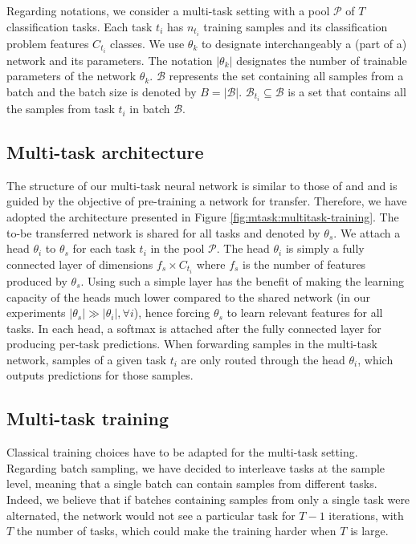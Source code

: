 Regarding notations, we consider a multi-task setting with a pool $\mathcal{P}$ of $T$ classification tasks. Each task $t_i$ has $n_{t_i}$ training samples and its classification problem features $C_{t_i}$ classes. We use $\theta_k$ to designate interchangeably a (part of a) network and its parameters. The notation $|\theta_k|$ designates the number of trainable parameters of the network $\theta_k$. $\mathcal{B}$ represents the set containing all samples from a batch and the batch size is denoted by $B = \left|\mathcal{B}\right|$. $\mathcal{B}_{t_i} \subseteq \mathcal{B}$ is a set that contains all the samples from task $t_i$ in batch $\mathcal{B}$. 

\subsection{Multi-task architecture}
\label{ssec:mtask:multitask-architecture}

The structure of our multi-task neural network is similar to those of \cite{shang2019and} and \cite{strezoski2019many} and is guided by the objective of pre-training a network for transfer. Therefore, we have adopted the architecture presented in Figure \ref{fig:mtask:multitask-training}. The to-be transferred network is shared for all tasks and denoted by $\theta_s$. We attach a head $\theta_i$ to $\theta_s$ for each task $t_i$ in the pool $\mathcal{P}$. The head $\theta_i$ is simply a fully connected layer of dimensions $f_s\times C_{t_i}$ where $f_s$ is the number of features produced by $\theta_s$. Using such a simple layer has the benefit of making the learning capacity of the heads much lower compared to the shared network (in our experiments $|\theta_s| \gg |\theta_i|, \forall i$), hence forcing $\theta_s$ to learn relevant features for all tasks. In each head, a softmax is attached after the fully connected layer for producing per-task predictions. When forwarding samples in the multi-task network, samples of a given task $t_i$ are only routed through the head $\theta_i$, which outputs predictions for those samples. 

\subsection{Multi-task training}
\label{ssec:mtask:multitask-training}

Classical training choices have to be adapted for the multi-task setting. Regarding batch sampling, we have decided to interleave tasks at the sample level, meaning that a single batch can contain samples from different tasks. Indeed, we believe that if batches containing samples from only a single task were alternated, the network would not see a particular task for $T-1$ iterations, with $T$ the number of tasks, which could make the training harder when $T$ is large.

